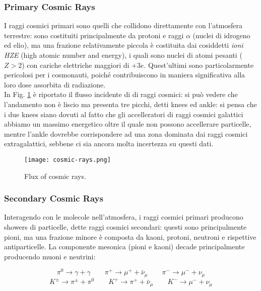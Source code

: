 \subsubsection{Primary Cosmic Rays}

I raggi cosmici primari sono quelli che collidono direttamente con l'atmosfera terrestre: sono costituiti principalmente da protoni e raggi $ \alpha $ (nuclei di idrogeno ed elio), ma una frazione relativamente piccola è costituita dai cosiddetti \textit{ioni HZE} (high atomic number and energy), i quali sono nuclei di atomi pesanti ($ Z > 2 $) con cariche elettriche maggiori di $ +3e $. Quest'ultimi sono particolarmente pericolosi per i cosmonauti, poiché contribuiscono in maniera significativa alla loro dose assorbita di radiazione.\\
In Fig. \ref{flux-cr} è riportato il flusso incidente di di raggi cosmici: si può vedere che l'andamento non è liscio ma presenta tre picchi, detti knees ed ankle: si pensa che i due knees siano dovuti al fatto che gli accelleratori di raggi cosmici galattici abbiamo un massimo energetico oltre il quale non possono accellerare particelle, mentre l'ankle dovrebbe corrispondere ad una zona dominata dai raggi cosmici extragalattici, sebbene ci sia ancora molta incertezza su questi dati.

\begin{figure}
	\centering
	\texttt{[image: cosmic-rays.png]}
	\caption{Flux of cosmic rays.}
	\label{flux-cr}
\end{figure}

\subsubsection{Secondary Cosmic Rays}

Interagendo con le molecole nell'atmosfera, i raggi cosmici primari producono showers di particelle, dette raggi cosmici secondari: questi sono principalmente pioni, ma una frazione minore è composta da kaoni, protoni, neutroni e rispettive antiparticelle. La componente mesonica (pioni e kaoni) decade principalmente producendo muoni e neutrini:

\begin{equation*}
	\pi^0 \rightarrow \gamma + \gamma \qquad \pi^+ \rightarrow \mu^+ + \bar{\nu}_{\mu} \qquad \pi^- \rightarrow \mu^- + \nu_{\mu}
\end{equation*}
\begin{equation*}
	K^{\pm} \rightarrow \pi^{\pm} + \pi^0 \qquad K^+ \rightarrow \pi^+ + \bar{\nu}_{\mu} \qquad K^- \rightarrow \mu^- + \nu_{\mu}
\end{equation*}

